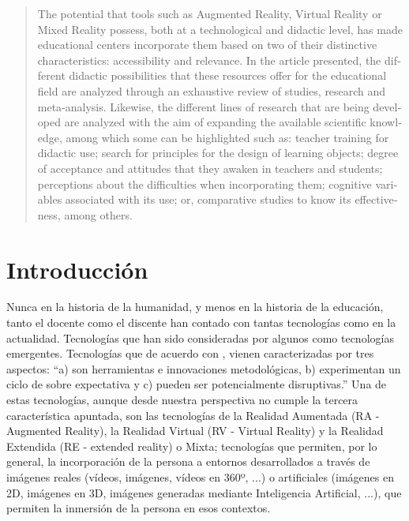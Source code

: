 \documentclass[spanish]{textolivre}
\begin{document}
\begin{polyabstract}
\begin{portuguese}
\begin{abstract}
\end{abstract}
\end{portuguese}

\begin{english}
\begin{abstract}
The potential that tools such as Augmented Reality, Virtual Reality or Mixed Reality possess, both at a technological and didactic level, has made educational centers incorporate them based on two of their distinctive characteristics: accessibility and relevance. In the article presented, the different didactic possibilities that these resources offer for the educational field are analyzed through an exhaustive review of studies, research and meta-analysis. Likewise, the different lines of research that are being developed are analyzed with the aim of expanding the available scientific knowledge, among which some can be highlighted such as: teacher training for didactic use; search for principles for the design of learning objects; degree of acceptance and attitudes that they awaken in teachers and students; perceptions about the difficulties when incorporating them; cognitive variables associated with its use; or, comparative studies to know its effectiveness, among others.

\end{abstract}
\end{english}
\end{polyabstract}

\section{Introducción}
Nunca en la historia de la humanidad, y menos en la historia de la educación, tanto el docente como el discente han contado con tantas tecnologías como en la actualidad. Tecnologías que han sido consideradas por algunos como tecnologías emergentes. Tecnologías que de acuerdo con \textcite[p.~13]{cabero_2023}, vienen caracterizadas por tres aspectos: “a) son herramientas e innovaciones metodológicas, b) experimentan un ciclo de sobre expectativa y c) pueden ser potencialmente disruptivas.” Una de estas tecnologías, aunque desde nuestra perspectiva no cumple la tercera característica apuntada, son las tecnologías de la Realidad Aumentada (RA - Augmented Reality), la Realidad Virtual (RV - Virtual Reality) y la Realidad Extendida (RE - extended reality) o Mixta; tecnologías que permiten, por lo general, la incorporación de la persona a entornos desarrollados a través de imágenes reales (vídeos, imágenes, vídeos en 360º, ...) o artificiales (imágenes en 2D, imágenes en 3D, imágenes generadas mediante Inteligencia Artificial, ...), que permiten la inmersión de la persona en esos contextos.
\end{document}
